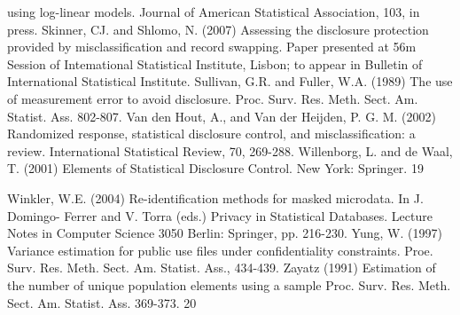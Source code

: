 using log-linear models. Journal of American Statistical Association, 103, in press.
Skinner, CJ. and Shlomo, N. (2007) Assessing the disclosure protection provided by
misclassification and record swapping. Paper presented at 56m Session of
Intemational Statistical Institute, Lisbon; to appear in Bulletin of International
Statistical Institute.
Sullivan, G.R. and Fuller, W.A. (1989) The use of measurement error to avoid disclosure.
Proc. Surv. Res. Meth. Sect. Am. Statist. Ass. 802-807.
Van den Hout, A., and Van der Heijden, P. G. M. (2002) Randomized response,
statistical disclosure control, and misclassification: a review. International Statistical
Review, 70, 269-288.
Willenborg, L. and de Waal, T. (2001) Elements of Statistical Disclosure Control. New
York: Springer.
19



Winkler, W.E. (2004) Re-identification methods for masked microdata. In J. Domingo-
Ferrer and V. Torra (eds.) Privacy in Statistical Databases. Lecture Notes in
Computer Science 3050 Berlin: Springer, pp. 216-230.
Yung, W. (1997) Variance estimation for public use files under confidentiality
constraints. Proe. Surv. Res. Meth. Sect. Am. Statist. Ass., 434-439.
Zayatz (1991) Estimation of the number of unique population elements using a sample
Proc. Surv. Res. Meth. Sect. Am. Statist. Ass. 369-373.
20



